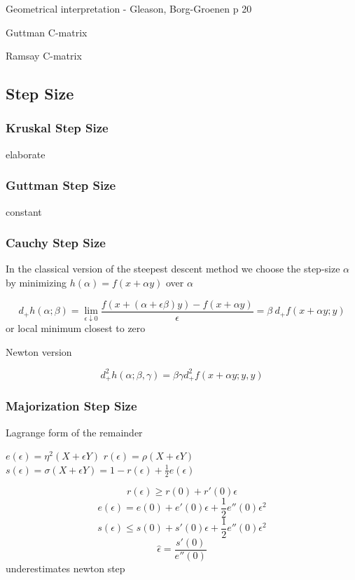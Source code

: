 \documentclass[
  12pt,
  letterpaper,
  DIV=11,
  numbers=noendperiod]{scrreprt}
\theoremstyle{remark}
\begin{document}
Geometrical interpretation - Gleason, Borg-Groenen p 20

Guttman C-matrix

Ramsay C-matrix

\subsection{Step Size}\label{step-size}

\subsubsection{Kruskal Step Size}\label{kruskal-step-size}

elaborate

\subsubsection{Guttman Step Size}\label{guttman-step-size}

constant

\subsubsection{Cauchy Step Size}\label{cauchy-step-size}

In the classical version of the steepest descent method we choose the
step-size \(\alpha\) by minimizing \(h(\alpha)=f(x+\alpha y)\) over
\(\alpha\)

\[
d_+h(\alpha;\beta)=\lim_{\epsilon\downarrow 0}\frac{f(x+(\alpha+\epsilon\beta)y)-f(x+\alpha y)}{\epsilon}=\beta\ d_+f(x+\alpha y;y)
\] or local minimum closest to zero

Newton version

\[
d_+^2h(\alpha;\beta,\gamma)=\beta\gamma d_+^2f(x+\alpha y;y,y)
\]

\subsubsection{Majorization Step Size}\label{majorization-step-size}

Lagrange form of the remainder

\(e(\epsilon)=\eta^2(X+\epsilon Y)\) \(r(\epsilon)=\rho(X+\epsilon Y)\)
\(s(\epsilon)=\sigma(X+\epsilon Y)=1-r(\epsilon)+\frac12e(\epsilon)\)

\[
r(\epsilon)\geq r(0)+r'(0)\epsilon
\] \[
e(\epsilon)=e(0)+e'(0)\epsilon+\frac12 e''(0)\epsilon^2
\] \[
s(\epsilon)\leq s(0)+s'(0)\epsilon+\frac12 e''(0)\epsilon^2
\] \[
\hat\epsilon=\frac{s'(0)}{e''(0)}
\] underestimates newton step
\end{document}
